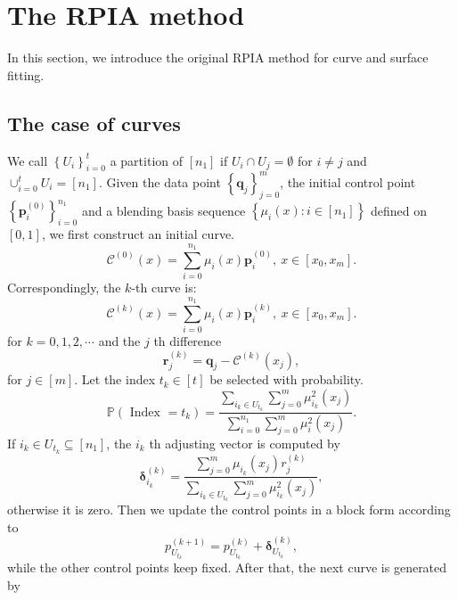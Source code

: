 \documentclass[11pt]{article}
\numberwithin{equation}{section}
\begin{document}
\section{The RPIA method}
In this section, we introduce the original RPIA method for curve and surface fitting\cite{WU2024128669}.

\subsection{The case of curves}
We call $\left\{U_{i}\right\}_{i=0}^{t}$ a partition of $\left[n_{1}\right]$ if $U_{i} \cap U_{j}=\emptyset$ for $i \neq j$ and $\cup_{i=0}^{t} U_{i}=\left[n_{1}\right]$. Given the data point $\left\{\boldsymbol{q}_{j}\right\}_{j=0}^{m}$, the initial control point $\left\{\boldsymbol{p}_{i}^{(0)}\right\}_{i=0}^{n_{1}}$ and a blending basis sequence $\left\{\mu_i(x): i \in\left[n_1\right]\right\}$ defined on $[0,1]$, we first construct an initial curve.
$$
\mathcal{C}^{(0)}(x)=\sum_{i=0}^{n_{1}} \mu_{i}(x) \boldsymbol{p}_{i}^{(0)},~x \in\left[x_{0}, x_{m}\right].
$$
Correspondingly, the $k$-th curve is:
\begin{equation*}
\mathcal{C}^{(k)}(x)=\sum_{i=0}^{n_{1}} \mu_{i}(x) \boldsymbol{p}_{i}^{(k)},~x \in\left[x_{0}, x_{m}\right].
\end{equation*}
for $k=0,1,2, \cdots$ and the $j$ th difference
\begin{equation*}
\boldsymbol{r}_{j}^{(k)}=\boldsymbol{q}_{j}-\mathcal{C}^{(k)}\left(x_{j}\right),
\end{equation*}
for $j \in[m]$. Let the index $t_{k} \in[t]$ be selected with probability.
\begin{equation*}
\mathbb{P}\left(\text { Index }=t_{k}\right)=\frac{\sum_{i_{k} \in U_{t_{k}}} \sum_{j=0}^{m} \mu_{i_{k}}^{2}\left(x_{j}\right)}{\sum_{i=0}^{n_{1}} \sum_{j=0}^{m} \mu_{i}^{2}\left(x_{j}\right)}. 
\end{equation*}
If $i_{k} \in U_{t_{k}} \subseteq\left[n_{1}\right]$, the $i_{k}$ th adjusting vector is computed by
\begin{equation*}
\boldsymbol{\delta}_{i_{k}}^{(k)}=\frac{\sum_{j=0}^{m} \mu_{i_{k}}\left(x_{j}\right) r_{j}^{(k)}}{\sum_{i_{k} \in U_{t_{k}}} \sum_{j=0}^{m} \mu_{i_{k}}^{2}\left(x_{j}\right)},
\end{equation*}
otherwise it is zero. Then we update the control points in a block form according to
\begin{equation*}
p_{U_{t_{k}}}^{(k+1)}=p_{U_{t_{k}}}^{(k)}+\boldsymbol\delta_{U_{t_{k}}}^{(k)},
\end{equation*}
while the other control points keep fixed. After that, the next curve is generated by
\end{document}
